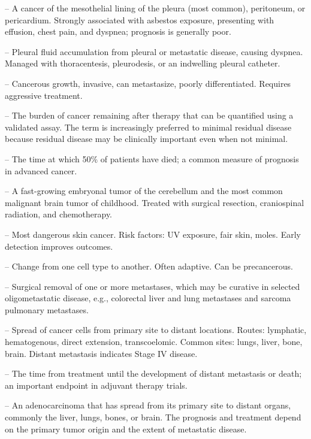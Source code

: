 -- A cancer of the mesothelial lining of the pleura (most common), peritoneum, or pericardium. Strongly associated with asbestos exposure, presenting with effusion, chest pain, and dyspnea; prognosis is generally poor.

-- Pleural fluid accumulation from pleural or metastatic disease, causing dyspnea. Managed with thoracentesis, pleurodesis, or an indwelling pleural catheter.


-- Cancerous growth, invasive, can metastasize, poorly differentiated. Requires aggressive treatment.

-- The burden of cancer remaining after therapy that can be quantified using a validated assay. The term is increasingly preferred to minimal residual disease because residual disease may be clinically important even when not minimal.

-- The time at which 50\% of patients have died; a common measure of prognosis in advanced cancer.

-- A fast-growing embryonal tumor of the cerebellum and the most common malignant brain tumor of childhood. Treated with surgical resection, craniospinal radiation, and chemotherapy.

-- Most dangerous skin cancer. Risk factors: UV exposure, fair skin, moles. Early detection improves outcomes.

-- Change from one cell type to another. Often adaptive. Can be precancerous.

-- Surgical removal of one or more metastases, which may be curative in selected oligometastatic disease, e.g., colorectal liver and lung metastases and sarcoma pulmonary metastases.

-- Spread of cancer cells from primary site to distant locations. Routes: lymphatic, hematogenous, direct extension, transcoelomic. Common sites: lungs, liver, bone, brain. Distant metastasis indicates Stage IV disease.

-- The time from treatment until the development of distant metastasis or death; an important endpoint in adjuvant therapy trials.

-- An adenocarcinoma that has spread from its primary site to distant organs, commonly the liver, lungs, bones, or brain. The prognosis and treatment depend on the primary tumor origin and the extent of metastatic disease.

